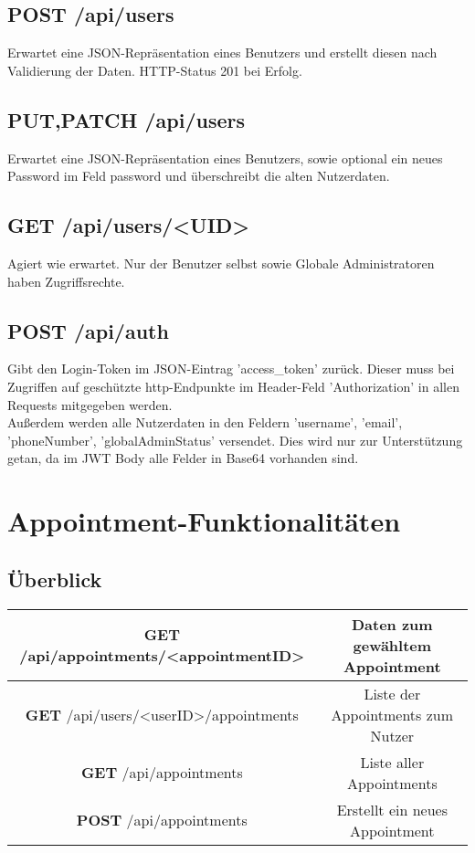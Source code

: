 \documentclass[11pt,a4paper]{article}
\begin{document}
\subsection{\textbf{POST} /api/users}
Erwartet eine JSON-Repräsentation eines Benutzers und erstellt diesen nach Validierung der Daten. HTTP-Status 201 bei Erfolg.
\subsection{\textbf{PUT,PATCH} /api/users}
Erwartet eine JSON-Repräsentation eines Benutzers, sowie optional ein neues Password im Feld password und überschreibt die alten Nutzerdaten.
\subsection{\textbf{GET} /api/users/<UID>}
Agiert wie erwartet. Nur der Benutzer selbst sowie Globale Administratoren haben Zugriffsrechte.
\subsection{\textbf{POST} /api/auth}
Gibt den Login-Token im JSON-Eintrag 'access\_token' zurück. Dieser muss bei Zugriffen auf geschützte http-Endpunkte im Header-Feld 'Authorization' in allen Requests mitgegeben werden.\\
Außerdem werden alle Nutzerdaten in den Feldern 'username', 'email', 'phoneNumber', 'globalAdminStatus' versendet. Dies wird nur zur Unterstützung getan, da im JWT Body alle Felder in Base64 vorhanden sind.
\section{Appointment-Funktionalitäten}
\subsection{Überblick}
\begin{tabular}{|c|c|}
\hline
\textbf{GET} /api/appointments/<appointmentID> & Daten zum gewähltem Appointment \\
\hline
\textbf{GET} /api/users/<userID>/appointments & Liste der Appointments zum Nutzer \\
\hline
\textbf{GET} /api/appointments & Liste aller Appointments \\
\hline
\textbf{POST} /api/appointments & Erstellt ein neues Appointment \\
\hline
\end{tabular}
\end{document}
